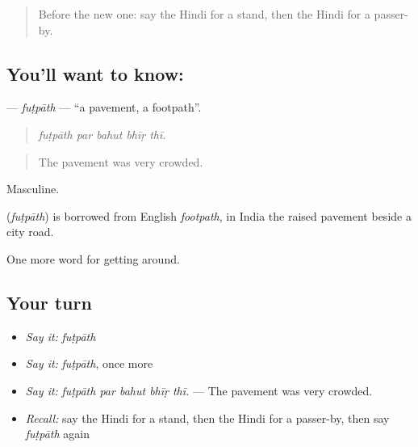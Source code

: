 \label{lesson:HI-C403-futpath}



\begin{quote}
Before the new one: say the Hindi for a stand, then the Hindi for a passer-by.
\end{quote}

\subsection*{You'll want to know: }
\textbf{} — \emph{fuṭpāth} — \textquotedblleft{}a pavement, a footpath\textquotedblright{}.

\begin{quote}
    
\end{quote}

\begin{quote}
\emph{fuṭpāth par bahut bhīṛ thī.}
\end{quote}

\begin{quote}
The pavement was very crowded.
\end{quote}

Masculine.

\begin{cousinweb}
\textbf{} (\emph{fuṭpāth}) is borrowed from English \emph{footpath}, in India the raised pavement beside a city road.
\end{cousinweb}

\begin{grammarlens}[title={What you've built}]
One more word for getting around.
\end{grammarlens}

\subsection*{Your turn}
\begin{itemize}
\raggedright
  \item \emph{Say it:} \emph{fuṭpāth}
  \item \emph{Say it:} \emph{fuṭpāth}, once more
  \item \emph{Say it:} \emph{fuṭpāth par bahut bhīṛ thī.} — The pavement was very crowded.
  \item \emph{Recall:} say the Hindi for a stand, then the Hindi for a passer-by, then say \emph{fuṭpāth} again
\end{itemize}

